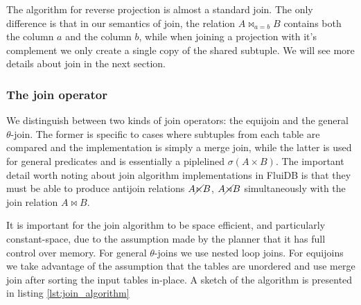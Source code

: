 The algorithm for reverse projection is almost a standard join. The
only difference is that in our semantics of join, the relation \(A
\Join_{a = b} B\) contains both the column \(a\) and the column \(b\),
while when joining a projection with it's complement we only create a
single copy of the shared subtuple. We will see more details about
join in the next section.

\subsubsection{The join operator}

We distinguish between two kinds of join operators: the equijoin and
the general \(\theta\)-join. The former is specific to cases where
subtuples from each table are compared and the implementation is
simply a merge join, while the latter is used for general predicates
and is essentially a piplelined \(\sigma(A \times B)\). The important
detail worth noting about join algorithm implementations in FluiDB is
that they must be able to produce antijoin relations \(A \cancel\ltimes B\),
\(A \cancel\rtimes B\) simultaneously with the join relation \(A \Join B\).

It is important for the join algorithm to be space efficient, and particularly
constant-space, due to the assumption made by the planner that it has full
control over memory. For general \(\theta\)-joins we use nested loop
joins. For equijoins we take advantage of the assumption that the
tables are unordered and use merge join after sorting the input tables
in-place. A sketch of the algorithm is presented in listing
\ref{lst:join_algorithm}

